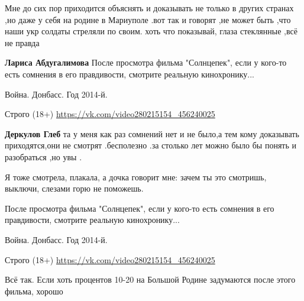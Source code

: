 \begin{itemize}

Мне до сих пор приходится объяснять и доказывать не только в других странах ,но
даже у себя на родине в Мариуполе .вот так и говорят ,не может быть ,что наши
укр солдаты стреляли по своим. хоть что показывай, глаза стеклянные ,всё не
правда

\begin{itemize}

 
\textbf{Лариса Абдугалимова} После просмотра фильма "Солнцепек", если у кого-то
есть сомнения в его правдивости, смотрите реальную кинохронику...

Война. Донбасс. Год 2014-й.

Строго (18+) \url{https://vk.com/video280215154_456240025}


 
\textbf{Деркулов Глеб} та у меня как раз сомнений нет и не было,а тем кому
доказывать приходятся,они не смотрят .бесполезно .за столько лет можно было бы
понять и разобраться ,но увы .
\end{itemize}

 
Я тоже смотрела, плакала, а дочка говорит мне: зачем ты это смотришь, выключи, слезами горю не поможешь.

 
После просмотра фильма "Солнцепек", если у кого-то есть сомнения в его
правдивости, смотрите реальную кинохронику...

Война. Донбасс. Год 2014-й.

Строго (18+) \url{https://vk.com/video280215154_456240025}

 
Всё так. Если хоть процентов 10-20 на Большой Родине задумаются после этого фильма, хорошо

\end{itemize}

